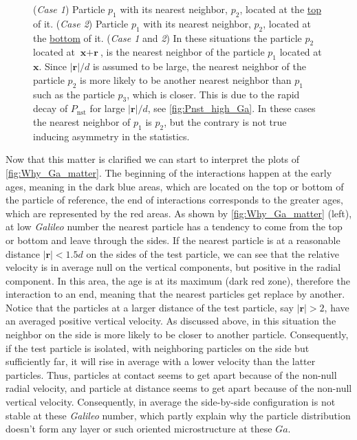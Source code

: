 \begin{figure}[h!]
{        (\textit{Case 1}) Particle $p_1$ with  its nearest neighbor, $p_2$, located at the \underline{top} of it. 
        (\textit{Case 2}) Particle $p_1$ with  its nearest neighbor, $p_2$, located at the \underline{bottom} of it. 
        (\textit{Case 1} and \textit{2})
        In these situations the particle $p_2$ located at $\textbf{x} + \textbf{r}$, is the nearest neighbor of the particle $p_1$ located at $\textbf{x}$. 
        Since $|\textbf{r}|/d$ is assumed to be large, the nearest neighbor of the particle $p_2$ is more likely to be another nearest neighbor than $p_1$ such as the particle $p_3$, which is closer.
        This is due to the rapid decay of $P_\text{nst}$ for large $|\textbf{r}|/d$, see \ref{fig:Pnst_high_Ga}. 
        In these cases the nearest neighbor of $p_1$ is $p_2$, but the contrary is not true inducing asymmetry in the statistics.  
    }
    \label{fig:diagram_asym}
\end{figure}

Now that this matter is clarified we can start to interpret the plots of \ref{fig:Why_Ga_matter}. 
The beginning of the interactions happen at the early ages, meaning in the dark blue areas, which are located on the top or bottom of the particle of reference, the end of interactions corresponds to the greater ages, which are represented by the red areas. 
As shown by \ref{fig:Why_Ga_matter} (left), at low \textit{Galileo} number the nearest particle has a tendency to come from the top or bottom and leave through the sides. 
If the nearest particle is at a reasonable distance $|\textbf{r}| < 1.5d$ on the sides of the test particle, we can see that the relative velocity is in average null on the vertical components, but positive in the radial component.
In this area, the age is at its maximum (dark red zone), therefore the interaction to an end, meaning that the nearest particles get replace by another. 
Notice that the particles at a larger distance of the test particle, say $|\textbf{r}|>2$, have an averaged positive vertical velocity. 
As discussed above, in this situation the neighbor on the side is more likely to be closer to another particle. 
Consequently, if the test particle is isolated, with neighboring particles on the side but sufficiently far, it will rise in average with a lower velocity than the latter particles.
Thus, particles at contact  seems to get apart because of the non-null radial velocity, and particle at distance seems to get apart because of the non-null vertical velocity.  
Consequently, in average the side-by-side configuration is not stable at these \textit{Galileo} number, which partly explain why the particle distribution doesn't form any layer or such oriented microstructure at these $Ga$.   

